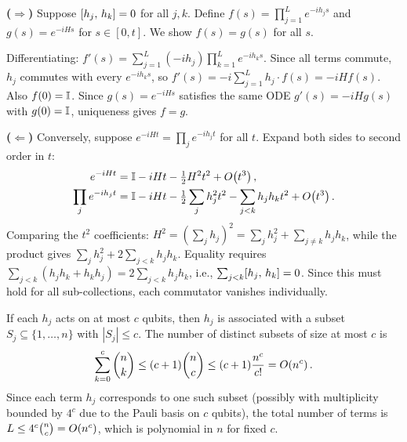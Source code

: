 \documentclass[12pt,oneside]{amsart}
\begin{document}
\begin{exercise}
\end{exercise}
\begin{solution}
  \textbf{($\Rightarrow$)} Suppose $[h_j,\,h_k]=0$ for all $j,k$.
  Define $f(s) = \prod_{j=1}^L e^{-ih_j s}$ and
  $g(s) = e^{-iHs}$ for $s\in[0,t]$.  We show $f(s) = g(s)$ for all $s$.

  Differentiating: $f'(s) = \sum_{j=1}^L (-ih_j)\prod_{k=1}^L e^{-ih_k s}$.
  Since all terms commute, $h_j$ commutes with every $e^{-ih_k s}$, so
  $f'(s) = -i\sum_{j=1}^L h_j \cdot f(s) = -iH f(s)$.  Also $f(0) = \mathbb{I}$.
  Since $g(s) = e^{-iHs}$ satisfies the same ODE $g'(s) = -iH g(s)$ with
  $g(0)=\mathbb{I}$, uniqueness gives $f=g$.

  \textbf{($\Leftarrow$)} Conversely, suppose
  $e^{-iHt}=\prod_j e^{-ih_j t}$ for all $t$.  Expand both sides to second
  order in $t$:
  \begin{align}
    e^{-iHt} &= \mathbb{I} - iHt - \tfrac{1}{2}H^2 t^2 + O\!\left(t^3\right), \\
    \prod_j e^{-ih_j t} &= \mathbb{I} - iHt - \tfrac{1}{2}\sum_j h_j^2 t^2
    - \sum_{j<k} h_j h_k t^2 + O\!\left(t^3\right).
  \end{align}
  Comparing the $t^2$ coefficients:
  $H^2 = \left(\sum_j h_j\right)^2 = \sum_j h_j^2 + \sum_{j\neq k} h_j h_k$,
  while the product gives $\sum_j h_j^2 + 2\sum_{j<k} h_j h_k$.
  Equality requires $\sum_{j<k}(h_j h_k + h_k h_j) = 2\sum_{j<k} h_j h_k$,
  i.e., $\sum_{j<k}[h_j,\,h_k]=0$.  Since this must hold for all
  sub-collections, each commutator vanishes individually.
\end{solution}

\begin{exercise}
\end{exercise}
\begin{solution}
  If each $h_j$ acts on at most $c$ qubits, then $h_j$ is associated with a
  subset $S_j \subseteq \{1,\ldots,n\}$ with $|S_j|\le c$.  The number of
  distinct subsets of size at most $c$ is
  \[
    \sum_{k=0}^c \binom{n}{k} \le (c+1)\binom{n}{c}
    \le (c+1)\frac{n^c}{c!} = O\!\left(n^c\right).
  \]
  Since each term $h_j$ corresponds to one such subset (possibly with
  multiplicity bounded by $4^c$ due to the Pauli basis on $c$ qubits), the
  total number of terms is $L \le 4^c \binom{n}{c} = O\!\left(n^c\right)$, which is
  polynomial in $n$ for fixed $c$.
\end{solution}
\end{document}
